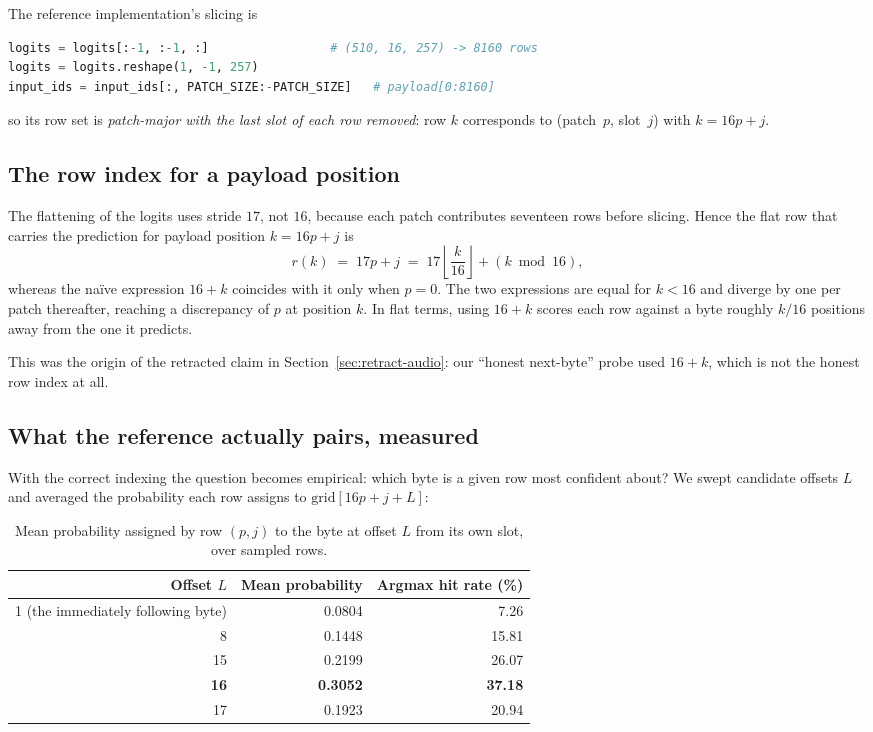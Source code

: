 \documentclass[11pt,a4paper]{article}
\begin{document}
The reference implementation's slicing is
\begin{lstlisting}[language=Python,numbers=none]
logits = logits[:-1, :-1, :]                 # (510, 16, 257) -> 8160 rows
logits = logits.reshape(1, -1, 257)
input_ids = input_ids[:, PATCH_SIZE:-PATCH_SIZE]   # payload[0:8160]
\end{lstlisting}
so its row set is \emph{patch-major with the last slot of each row removed}:
row $k$ corresponds to (patch~$p$, slot~$j$) with $k = 16p + j$.

\subsection{The row index for a payload position}

The flattening of the logits uses stride $17$, not $16$, because each patch
contributes seventeen rows before slicing. Hence the flat row that carries the
prediction for payload position $k = 16p + j$ is
\begin{equation}
r(k) \;=\; 17p + j \;=\; 17\left\lfloor \frac{k}{16}\right\rfloor
+ \left(k \bmod 16\right),
\label{eq:rowindex2}
\end{equation}
whereas the na\"ive expression $16 + k$ coincides with it only when
$p = 0$. The two expressions are equal for $k < 16$ and diverge by one per patch
thereafter, reaching a discrepancy of $p$ at position $k$. In flat terms, using
$16+k$ scores each row against a byte roughly $k/16$ positions away from the one
it predicts.

This was the origin of the retracted claim in
Section~\ref{sec:retract-audio}: our ``honest next-byte'' probe used $16+k$, which
is not the honest row index at all.

\subsection{What the reference actually pairs, measured}
\label{sec:bgpt-semantics}

With the correct indexing the question becomes empirical: which byte is a given
row most confident about? We swept candidate offsets $L$ and averaged the
probability each row assigns to $\mathrm{grid}[16p + j + L]$:

\begin{table}[htbp]
\centering
\small
\caption{Mean probability assigned by row $(p,j)$ to the byte at offset $L$ from
its own slot, over sampled rows.}
\label{tab:offsetsweep}
\begin{tabular}{rrr}
\toprule
Offset $L$ & Mean probability & Argmax hit rate (\%) \\
\midrule
1 (the immediately following byte) & 0.0804 & 7.26 \\
8 & 0.1448 & 15.81 \\
15 & 0.2199 & 26.07 \\
\textbf{16} & \textbf{0.3052} & \textbf{37.18} \\
17 & 0.1923 & 20.94 \\
\bottomrule
\end{tabular}
\end{table}
\end{document}

